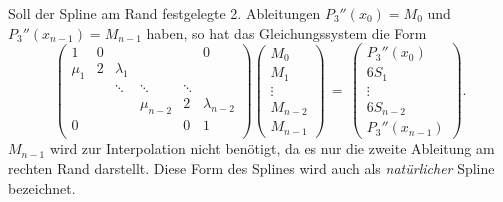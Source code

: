 Soll der Spline am Rand festgelegte 2. Ableitungen $P_3''(x_0) = M_0$
und $P_3''(x_{n-1}) = M_{n-1}$ haben, so hat das Gleichungssystem die
Form
\begin{equation}
  \label{eq:spline1}
  \begin{pmatrix}
    1      & 0         &           &           &           &         0 \\
    \mu_1  & 2         & \lambda_1 \\
           &           & \ddots    & \ddots    & \ddots \\
           &           &           & \mu_{n-2}  & 2         & \lambda_{n-2} \\
    0      &           &           &           & 0         & 1         \\
  \end{pmatrix}
  \begin{pmatrix}
    M_0\\
    M_1\\
    \vdots\\
    M_{n-2}\\
    M_{n-1}
  \end{pmatrix} \,=\,
  \begin{pmatrix}
    P_3''(x_0)\\
    6S_1\\
    \vdots\\
    6S_{n-2} \\
    P_3''(x_{n-1})
  \end{pmatrix}.
\end{equation}
$M_{n-1}$ wird zur Interpolation nicht benötigt, da es nur die zweite
Ableitung am rechten Rand darstellt. Diese Form des Splines wird auch
als \emph{natürlicher} Spline bezeichnet.

